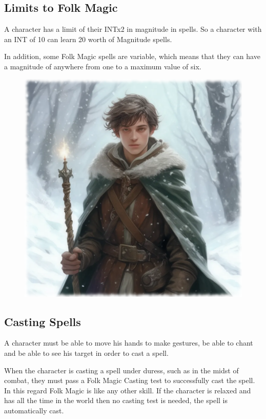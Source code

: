 \subsection{Limits to Folk Magic}
A character has a limit of their INTx2 in magnitude in spells. So a character with an INT of 10 can learn 20 worth of Magnitude spells.

In addition, some Folk Magic spells are variable, which means that they can have a magnitude of anywhere from one to a maximum value of six.

\begin{figure}[h]
\begin{center}
\includegraphics[scale=0.24]{img/ai-images/young-wizard-in-snow.png}
\end{center}
\end{figure}

\subsection{Casting Spells}
A character must be able to move his hands to make gestures, be able to chant and be able to see his target in order to cast a spell.

When the character is casting a spell under duress, such as in the midst of combat, they must pass a Folk Magic Casting test to successfully cast the spell. In this regard Folk Magic is like any other skill. If the character is relaxed and has all the time in the world then no casting test is needed, the spell is automatically cast.

